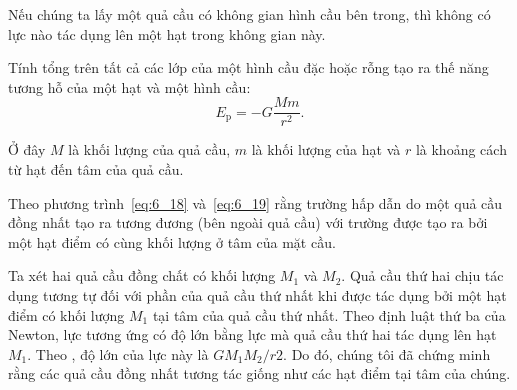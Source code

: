 Nếu chúng ta lấy một quả cầu có không gian hình cầu bên trong, thì không có lực nào tác dụng lên một hạt trong không gian này.

Tính tổng  trên tất cả các lớp của một hình cầu đặc hoặc rỗng tạo ra thế năng tương hỗ của một hạt và một hình cầu:
\begin{equation}\label{eq:6_19}
	E_{\text{p}} = -G\frac{Mm}{r^2}.
\end{equation}

\noindent
Ở đây $M$ là khối lượng của quả cầu, $m$ là khối lượng của hạt và $r$ là khoảng cách từ hạt đến tâm của quả cầu.

Theo phương trình~\eqref{eq:6_18} và~\eqref{eq:6_19} rằng trường hấp dẫn do một quả cầu đồng nhất tạo ra tương đương (bên ngoài quả cầu) với trường được tạo ra bởi một hạt điểm có cùng khối lượng ở tâm của mặt cầu.

Ta xét hai quả cầu đồng chất có khối lượng $M_1$ và $M_2$. Quả cầu thứ hai chịu tác dụng tương tự đối với phần của quả cầu thứ nhất khi được tác dụng bởi một hạt điểm có khối lượng $M_1$ tại tâm của quả cầu thứ nhất. Theo định luật thứ ba của Newton, lực tương ứng có độ lớn bằng lực mà quả cầu thứ hai tác dụng lên hạt $M_1$. Theo , độ lớn của lực này là $GM_1M_2/r2$. Do đó, chúng tôi đã chứng minh rằng các quả cầu đồng nhất tương tác giống như các hạt điểm tại tâm của chúng.

